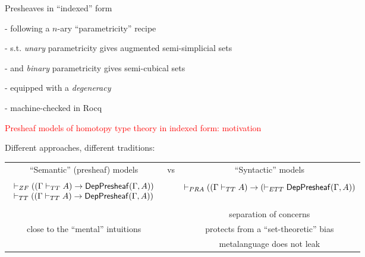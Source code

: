 \documentclass[12pt,landscape]{article}
\begin{document}
\begin{LARGE}
\begin{sf}
\bigskip
\noindent Presheaves in ``indexed'' form
\bigskip

\noindent - following a $n$-ary ``parametricity'' recipe
\bigskip

 - s.t. \emph{unary} parametricity gives augmented semi-simplicial sets
\bigskip

 - and \emph{binary} parametricity gives semi-cubical sets
\bigskip

\noindent - equipped with a \emph{degeneracy}
\bigskip

\noindent - machine-checked in Rocq




\iffalse
\newpage

\begin{center}
\textcolor{red}{\huge Presheaf models of homotopy type theory in indexed form: motivation}
\end{center}

\bigskip

Different approaches, different traditions:
\bigskip

\begin{tabular}{ccc}
``Semantic'' (presheaf) models & vs & ``Syntactic'' models\\
\\
$
\begin{array}{l}
\vdash_{ZF} ((\Gamma \vdash_{TT} A) \rightarrow \mathsf{DepPresheaf}(\Gamma,A))\\
\vdash_{TT} ((\Gamma \vdash_{TT} A) \rightarrow \mathsf{DepPresheaf}(\Gamma,A))\\
\end{array}
$ & &
$\vdash_{PRA} ((\Gamma \vdash_{TT} A) \rightarrow (\vdash_{ETT} \mathsf{DepPresheaf}(\Gamma,A))$\\
\\
& & separation of concerns \\
close to the ``mental'' intuitions & &
protects from a ``set-theoretic'' bias\\
& & metalanguage does not leak\\
\end{tabular}


\end{sf}
\end{LARGE}
\end{document}
